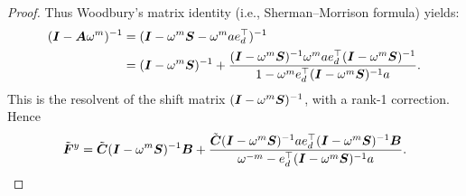 \begin{proof}
Thus Woodbury's matrix identity (i.e., Sherman--Morrison formula) yields:
\begin{align*}
  (\boldsymbol{I} - \boldsymbol{A} \omega^m)^{-1}
  &= (\boldsymbol{I} - \omega^m\boldsymbol{S} - \omega^m a e_d^\top)^{-1} \\
  &= (\boldsymbol{I} - \omega^m\boldsymbol{S})^{-1} + \frac{(\boldsymbol{I} - \omega^m\boldsymbol{S})^{-1} \omega^m a e_d^\top (\boldsymbol{I} - \omega^m\boldsymbol{S})^{-1}}{1 - \omega^m e_d^\top (\boldsymbol{I} - \omega^m\boldsymbol{S})^{-1} a}.
\end{align*}
This is the resolvent of the shift matrix $(\boldsymbol{I} - \omega^m \boldsymbol{S})^{-1}$, with a rank-1
correction.
Hence
\begin{equation}
  \label{eq:woodbury}
  \tilde{\boldsymbol{F}}^y = \tilde{\boldsymbol{C}} (\boldsymbol{I} - \omega^m\boldsymbol{S})^{-1} \boldsymbol{B} + \frac{\tilde{\boldsymbol{C}}(\boldsymbol{I} - \omega^m\boldsymbol{S})^{-1} a e_d^\top (\boldsymbol{I} - \omega^m\boldsymbol{S})^{-1} \boldsymbol{B}}{\omega^{-m} - e_d^\top (\boldsymbol{I} - \omega^m\boldsymbol{S})^{-1} a}.
\end{equation}


\end{proof}
